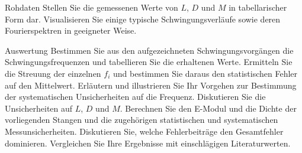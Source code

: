 \documentclass[twoside]{protokoll}
\begin{document}
\begin{aufgabe}{Rohdaten}
  Stellen Sie die gemessenen Werte von $L$, $D$ und $M$ in
  tabellarischer Form dar. Visualisieren Sie einige typische
  Schwingungsverläufe sowie deren Fourierspektren in geeigneter
  Weise.
\end{aufgabe}

\begin{aufgabe}{Auswertung}
  Bestimmen Sie aus den aufgezeichneten Schwingungsvorgängen die
  Schwingungsfrequenzen und tabellieren Sie die erhaltenen
  Werte. Ermitteln Sie die Streuung der einzelnen $f_i$ und bestimmen
  Sie daraus den statistischen Fehler auf den Mittelwert. Erläutern
  und illustrieren Sie Ihr Vorgehen zur Bestimmung der systematischen
  Unsicherheiten auf die Frequenz. Diskutieren Sie die Unsicherheiten
  auf $L$, $D$ und $M$. Berechnen Sie den E-Modul und die Dichte der
  vorliegenden Stangen und die zugehörigen statistischen und
  systematischen Messunsicherheiten. Diskutieren Sie, welche
  Fehlerbeiträge den Gesamtfehler dominieren. Vergleichen Sie Ihre
  Ergebnisse mit einschlägigen Literaturwerten.
\end{aufgabe}
 
\end{document}
